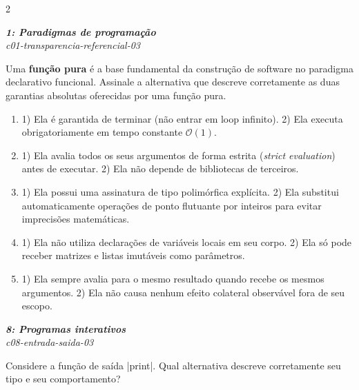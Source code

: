 \documentclass[a4paper,10pt,brazil]{article}
\begin{document}
\begin{multicols}{2}
\begin{enumerate}
\end{enumerate}

\begin{flushright}
  \footnotesize
  \textit{\textbf{1: Paradigmas de programação}}\\
  \textit{c01-transparencia-referencial-03}\\

\end{flushright}
Uma \textbf{função pura} é a base fundamental da construção de software no paradigma declarativo funcional. Assinale a alternativa que descreve corretamente as duas garantias absolutas oferecidas por uma função pura.

\begin{enumerate}
  \item 1) Ela é garantida de terminar (não entrar em loop infinito). 2) Ela executa obrigatoriamente em tempo constante $\mathcal{O}(1)$.

  \item 1) Ela avalia todos os seus argumentos de forma estrita (\emph{strict evaluation}) antes de executar. 2) Ela não depende de bibliotecas de terceiros.

  \item 1) Ela possui uma assinatura de tipo polimórfica explícita. 2) Ela substitui automaticamente operações de ponto flutuante por inteiros para evitar imprecisões matemáticas.

  \item 1) Ela não utiliza declarações de variáveis locais em seu corpo. 2) Ela só pode receber matrizes e listas imutáveis como parâmetros.

  \item 1) Ela sempre avalia para o mesmo resultado quando recebe os mesmos argumentos. 2) Ela não causa nenhum efeito colateral observável fora de seu escopo.


\end{enumerate}

\begin{flushright}
  \footnotesize
  \textit{\textbf{8: Programas interativos}}\\
  \textit{c08-entrada-saida-03}\\

\end{flushright}
Considere a função de saída \haskellinline|print|. Qual alternativa descreve corretamente seu tipo e seu comportamento?


\end{multicols}
\end{document}
